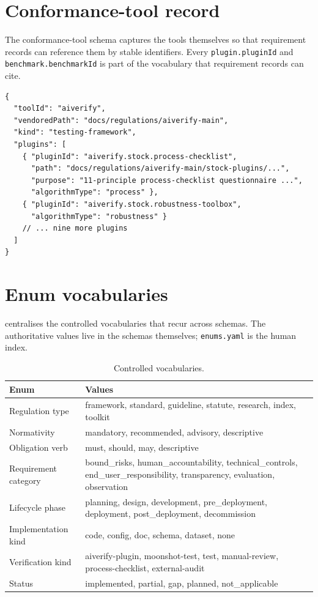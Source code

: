 \section{Conformance-tool record}

The conformance-tool schema captures the tools themselves so that
requirement records can reference them by stable identifiers. Every
\texttt{plugin.pluginId} and \texttt{benchmark.benchmarkId} is part of the
vocabulary that requirement records can cite.

\begin{lstlisting}[language=jsonx,caption={Excerpt of
\texttt{docs/regulations/machine-readable/specification-addendum.yaml} (\texttt{conformance-tools.aiverify}).}]
{
  "toolId": "aiverify",
  "vendoredPath": "docs/regulations/aiverify-main",
  "kind": "testing-framework",
  "plugins": [
    { "pluginId": "aiverify.stock.process-checklist",
      "path": "docs/regulations/aiverify-main/stock-plugins/...",
      "purpose": "11-principle process-checklist questionnaire ...",
      "algorithmType": "process" },
    { "pluginId": "aiverify.stock.robustness-toolbox",
      "algorithmType": "robustness" }
    // ... nine more plugins
  ]
}
\end{lstlisting}

\section{Enum vocabularies}

 centralises the controlled vocabularies
that recur across schemas. The authoritative values live in the schemas
themselves; \texttt{enums.yaml} is the human index.

\begin{table}[h]
\centering
\small
\begin{tabularx}{\textwidth}{lX}
\toprule
\textbf{Enum} & \textbf{Values} \\
\midrule
Regulation type & framework, standard, guideline, statute, research, index, toolkit \\
Normativity    & mandatory, recommended, advisory, descriptive \\
Obligation verb & must, should, may, descriptive \\
Requirement category & bound\_risks, human\_accountability, technical\_controls, end\_user\_responsibility, transparency, evaluation, observation \\
Lifecycle phase & planning, design, development, pre\_deployment, deployment, post\_deployment, decommission \\
Implementation kind & code, config, doc, schema, dataset, none \\
Verification kind & aiverify-plugin, moonshot-test, test, manual-review, process-checklist, external-audit \\
Status & implemented, partial, gap, planned, not\_applicable \\
\bottomrule
\end{tabularx}
\caption{Controlled vocabularies.}
\label{tab:enums}
\end{table}
\clearpage
